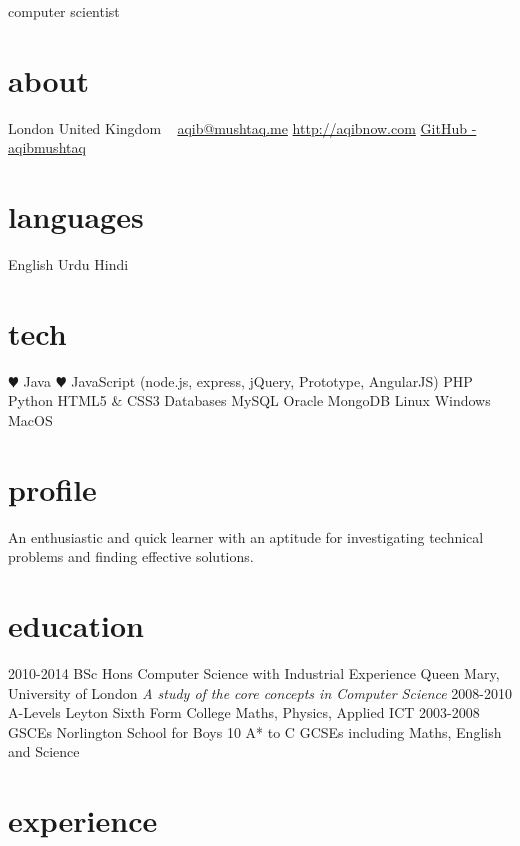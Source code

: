 \documentclass[]{friggeri-cv}
\begin{document}
       {computer scientist}

\begin{aside}
  \section{about}
    London
    United Kingdom
    ~
    \href{mailto:aqib@mushtaq.me}{aqib@mushtaq.me}
    \href{http://aqibnow.com}{http://aqibnow.com}
    \href{https://github.com/aqibmushtaq}{GitHub - aqibmushtaq}
  \section{languages}
    English
    Urdu
    Hindi
  \section{tech}
    {\color{red} $\varheartsuit$} Java
    {\color{red} $\varheartsuit$} JavaScript
    (node.js, express, jQuery, Prototype, AngularJS)
    PHP
    Python
    HTML5 \& CSS3
    Databases
    MySQL
    Oracle
    MongoDB
    Linux
    Windows
    MacOS
\end{aside}

\section{profile}

An enthusiastic and quick learner with an aptitude for investigating technical problems and finding effective solutions.

\section{education}

\begin{entrylist}
  \entry
    {2010-2014}
    {BSc Hons {\normalfont Computer Science with Industrial Experience}}
    {Queen Mary, University of London}
    {\emph{A study of the core concepts in Computer Science}}
  \entry
    {2008-2010}
    {A-Levels}
    {Leyton Sixth Form College}
    {Maths, Physics, Applied ICT}
  \entry
    {2003-2008}
    {GSCEs}
    {Norlington School for Boys}
    {10 A* to C GCSEs including Maths, English and Science}
\end{entrylist}

\section{experience}
\end{document}

